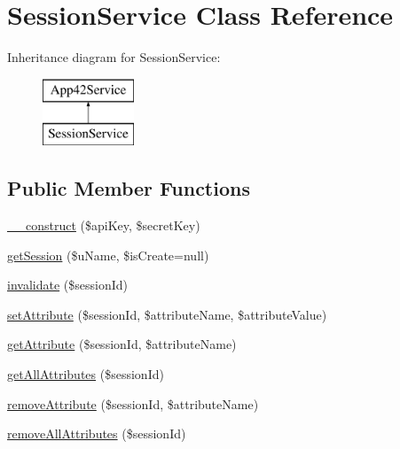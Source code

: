 \hypertarget{class_session_service}{\section{Session\+Service Class Reference}
\label{class_session_service}
}
Inheritance diagram for Session\+Service\+:\begin{figure}[H]
\begin{center}
\leavevmode
\includegraphics[height=2.000000cm]{class_session_service}
\end{center}
\end{figure}
\subsection*{Public Member Functions}
\begin{DoxyCompactItemize}
\item 
\hyperlink{class_session_service_a49f2ad222e06420736d750e167d55d7c}{\+\_\+\+\_\+construct} (\$api\+Key, \$secret\+Key)
\item 
\hyperlink{class_session_service_ac4752721b0b171923abf1f5a0efc06d1}{get\+Session} (\$u\+Name, \$is\+Create=null)
\item 
\hyperlink{class_session_service_a697a8111faa848860cfb3ab13e04f76c}{invalidate} (\$session\+Id)
\item 
\hyperlink{class_session_service_a7d023ef7579508c65abc9f4e310e683d}{set\+Attribute} (\$session\+Id, \$attribute\+Name, \$attribute\+Value)
\item 
\hyperlink{class_session_service_a4150511baf159e5b71e024089fbd786f}{get\+Attribute} (\$session\+Id, \$attribute\+Name)
\item 
\hyperlink{class_session_service_a779ee7003ef981cd40eac075162956b2}{get\+All\+Attributes} (\$session\+Id)
\item 
\hyperlink{class_session_service_ac31819f9282a4a832dc3bd27dc4b6da6}{remove\+Attribute} (\$session\+Id, \$attribute\+Name)
\item 
\hyperlink{class_session_service_aa7800e6c1d927c1c6036bd19b437e28d}{remove\+All\+Attributes} (\$session\+Id)
\end{DoxyCompactItemize}
